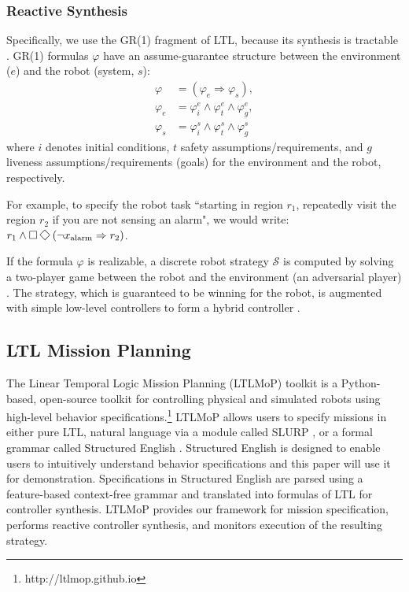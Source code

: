 \subsubsection*{Reactive Synthesis}
Specifically, we use the GR(1) fragment of LTL, because its synthesis is tractable \cite{piterman_06}. GR(1) formulas $\varphi$ have an assume-guarantee structure between the environment ($e$) and the robot (system, $s$):
\begin{align*}
	\varphi &= (\varphi_e \Rightarrow \varphi_s),\\
	\varphi_e &= \varphi_i^e \wedge \varphi_t^e \wedge \varphi_g^e,\\
	\varphi_s &= \varphi_i^s \wedge \varphi_t^s \wedge \varphi_g^s
\end{align*}
where $i$ denotes initial conditions, $t$ safety assumptions/requirements, and $g$ liveness assumptions/requirements (goals) for the environment and the robot, respectively.

For example, to specify the robot task ``starting in region $r_1$, repeatedly visit the region $r_2$ if you are not sensing an alarm", we would write: $r_1 \wedge \G\F \left(\neg x_{\text{alarm}} \Rightarrow  r_2 \right)$.

If the formula $\varphi$ is realizable, a discrete robot strategy $\mathcal{S}$ is computed by solving a two-player game between the robot and the environment (an adversarial player) \cite{piterman_06}. The strategy, which is guaranteed to be winning for the robot, is augmented with simple low-level controllers to form a hybrid controller \cite{KGFP_TRO09}.

\subsection{LTL Mission Planning}\label{preliminariesB}

The Linear Temporal Logic Mission Planning (LTLMoP) toolkit \cite{Finucane2010} is a Python-based, open-source toolkit for controlling physical and simulated robots using high-level behavior specifications.\footnote{http://ltlmop.github.io} 
LTLMoP allows users to specify missions in either pure LTL, natural language via a module called SLURP \cite{RamanRSS2013}, or a formal grammar called Structured English \cite{JFRKGICRA12}. 
Structured English is designed to enable users to intuitively understand behavior specifications and this paper will use it for demonstration. 
Specifications in Structured English are parsed using a feature-based context-free grammar and translated into formulas of LTL for controller synthesis. 
LTLMoP provides our framework for mission specification, performs reactive controller synthesis, and monitors execution of the resulting strategy. 
